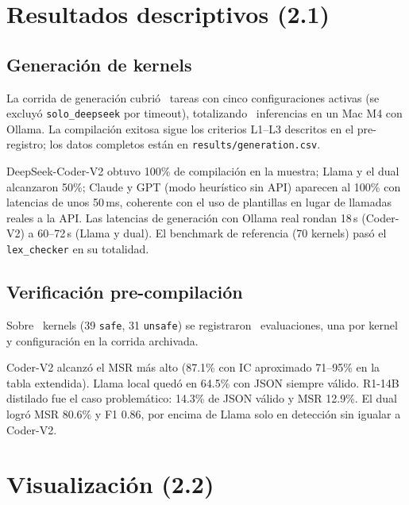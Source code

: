 \section{Resultados descriptivos (2.1)}

\subsection{Generación de kernels}

La corrida de generación cubrió \Ntasks\ tareas con cinco configuraciones activas (se excluyó \texttt{solo\_deepseek} por timeout), totalizando \Ngen\ inferencias en un Mac M4 con Ollama. La compilación exitosa sigue los criterios L1--L3 descritos en el pre-registro; los datos completos están en \texttt{results/generation.csv}.



DeepSeek-Coder-V2 obtuvo 100\% de compilación en la muestra; Llama y el dual alcanzaron 50\%; Claude y GPT (modo heurístico sin API) aparecen al 100\% con latencias de unos 50\,ms, coherente con el uso de plantillas en lugar de llamadas reales a la API. Las latencias de generación con Ollama real rondan 18\,s (Coder-V2) a 60--72\,s (Llama y dual). El benchmark de referencia (70 kernels) pasó el \texttt{lex\_checker} en su totalidad.

\subsection{Verificación pre-compilación}

Sobre \Nkernels\ kernels (39 \texttt{safe}, 31 \texttt{unsafe}) se registraron \Neval\ evaluaciones, una por kernel y configuración en la corrida archivada.







Coder-V2 alcanzó el MSR más alto (87.1\% con IC aproximado 71--95\% en la tabla extendida). Llama local quedó en 64.5\% con JSON siempre válido. R1-14B distilado fue el caso problemático: 14.3\% de JSON válido y MSR 12.9\%. El dual logró MSR 80.6\% y F1 0.86, por encima de Llama solo en detección sin igualar a Coder-V2.

\section{Visualización (2.2)}

